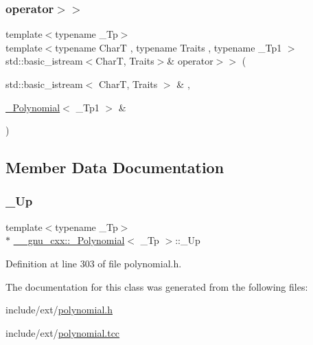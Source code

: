\subsubsection{\texorpdfstring{operator$>$$>$}{operator>>}}
{\footnotesize\ttfamily template$<$typename \+\_\+\+Tp$>$ \\
template$<$typename CharT , typename Traits , typename \+\_\+\+Tp1 $>$ \\
std\+::basic\+\_\+istream$<$CharT, Traits$>$\& operator$>$$>$ (\begin{DoxyParamCaption}\item[{std\+::basic\+\_\+istream$<$ CharT, Traits $>$ \&}]{,  }\item[{\hyperlink{class____gnu__cxx_1_1__Polynomial}{\+\_\+\+Polynomial}$<$ \+\_\+\+Tp1 $>$ \&}]{ }\end{DoxyParamCaption})\hspace{0.3cm}{\ttfamily [friend]}}



\subsection{Member Data Documentation}
\mbox{\label{class____gnu__cxx_1_1__Polynomial_a242114d4b86648a5dff67a8221f80d40}} 
\subsubsection{\texorpdfstring{\+\_\+\+Up}{\_Up}}
{\footnotesize\ttfamily template$<$typename \+\_\+\+Tp$>$ \\
$\ast$ \hyperlink{class____gnu__cxx_1_1__Polynomial}{\+\_\+\+\_\+gnu\+\_\+cxx\+::\+\_\+\+Polynomial}$<$ \+\_\+\+Tp $>$\+::\+\_\+\+Up}



Definition at line 303 of file polynomial.\+h.



The documentation for this class was generated from the following files\+:\begin{DoxyCompactItemize}
\item 
include/ext/\hyperlink{polynomial_8h}{polynomial.\+h}\item 
include/ext/\hyperlink{polynomial_8tcc}{polynomial.\+tcc}\end{DoxyCompactItemize}
